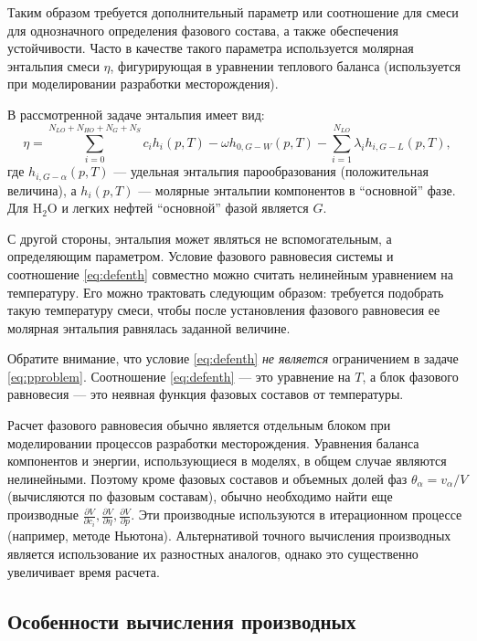 \documentclass[12pt]{article}
\newcommand{\pd}[2]{\frac{\partial #1}{\partial #2}}
\begin{document}
Таким образом требуется дополнительный параметр или соотношение для смеси для однозначного определения фазового состава, а также обеспечения устойчивости. Часто в качестве такого параметра используется молярная энтальпия смеси $\eta$, фигурирующая в уравнении теплового баланса (используется при моделировании разработки месторождения).

В рассмотренной задаче энтальпия имеет вид:
\begin{equation}
\eta = 
\sum_{i=0}^{N_{LO}+N_{HO}+N_{G}+N_{S}} c_i h_i(p,T) -\omega h_{0,G-W}(p,T) -\sum_{i=1}^{N_{LO}} \lambda_i h_{i,G-L}(p,T) 
,
\label{eq:defenth}
\end{equation}
где $h_{i,G-\alpha}(p,T)$ --- удельная энтальпия парообразования (положительная величина), а $h_i(p,T)$ --- молярные энтальпии компонентов в ``основной'' фазе. Для $\mathrm{H_2O}$ и легких нефтей ``основной'' фазой является $G$.

С другой стороны, энтальпия может являться не вспомогательным, а определяющим параметром. Условие фазового равновесия системы и соотношение \eqref{eq:defenth} совместно можно считать нелинейным уравнением на температуру. Его можно трактовать следующим образом: требуется подобрать такую температуру смеси, чтобы после установления фазового равновесия ее молярная энтальпия равнялась заданной величине.

Обратите внимание, что условие \eqref{eq:defenth} \emph{не является} ограничением в задаче \eqref{eq:pproblem}. Соотношение \eqref{eq:defenth} --- это уравнение на $T$, а блок фазового равновесия --- это неявная функция фазовых составов от температуры.

Расчет фазового равновесия обычно является отдельным блоком при моделировании процессов разработки месторождения. Уравнения баланса компонентов и энергии, использующиеся в моделях, в общем случае являются нелинейными. Поэтому кроме фазовых составов и объемных долей фаз $\theta_\alpha = {v_\alpha}/{V}$ (вычисляются по фазовым составам), обычно необходимо найти еще
производные $\pd{V}{c_i}, \pd{V}{\eta}, \pd{V}{p}$. Эти производные используются в итерационном процессе (например, методе Ньютона). Альтернативой точного вычисления производных является использование их разностных аналогов, однако это существенно увеличивает время расчета.

\subsection{Особенности вычисления производных} \label{ss:derivatives}
\end{document}
